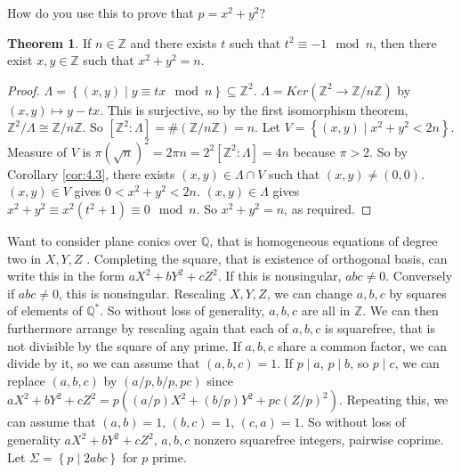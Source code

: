 \documentclass{article}
\newcommand{\Z}{\mathbb{Z}}
\newcommand{\Q}{\mathbb{Q}}
\newcommand{\rb}[1]{\left( #1 \right)}
\renewcommand{\sb}[1]{\left[ #1 \right]}
\newcommand{\cb}[1]{\left\{ #1 \right\}}
\theoremstyle{definition}\newtheorem{definition}{Definition}[section]
\theoremstyle{definition}\newtheorem{remark}[definition]{Remark}
\theoremstyle{definition}\newtheorem*{example}{Example}
\theoremstyle{definition}\newtheorem*{note}{Note}
\newtheorem{theorem}[definition]{Theorem}
\begin{document}
How do you use this to prove that $ p = x^2 + y^2 $?


\begin{theorem}
If $ n \in \Z $ and there exists $ t $ such that $ t^2 \equiv -1 \mod n $, then there exist $ x, y \in \Z $ such that $ x^2 + y^2 = n $.
\end{theorem}

\begin{proof}
$ \Lambda = \cb{\rb{x, y} \mid y \equiv tx \mod n} \subseteq \Z^2 $. $ \Lambda = Ker\rb{\Z^2 \to \Z / n\Z} $ by $ \rb{x, y} \mapsto y - tx $. This is surjective, so by the first isomorphism theorem, $ \Z^2 / \Lambda \cong \Z / n\Z $. So $ \sb{\Z^2 : \Lambda} = \#\rb{\Z / n\Z} = n $. Let $ V = \cb{\rb{x, y} \mid x^2 + y^2 < 2n} $. Measure of $ V $ is $ \pi\rb{\sqrt{n}}^2 = 2\pi n = 2^2\sb{\Z^2 : \Lambda} = 4n $ because $ \pi > 2 $. So by Corollary \ref{cor:4.3}, there exists $ \rb{x, y} \in \Lambda \cap V $ such that $ \rb{x, y} \ne \rb{0, 0} $. $ \rb{x, y} \in V $ gives $ 0 < x^2 + y^2 < 2n $. $ \rb{x, y} \in \Lambda $ gives $ x^2 + y^2 \equiv x^2\rb{t^2 + 1} \equiv 0 \mod n $. So $ x^2 + y^2 = n $, as required.
\end{proof}

Want to consider plane conics over $ \Q $, that is homogeneous equations of degree two in $ X, Y, Z $ . Completing the square, that is existence of orthogonal basis, can write this in the form $ aX^2 + bY^2 + cZ^2 $. If this is nonsingular, $ abc \ne 0 $. Conversely if $ abc \ne 0 $, this is nonsingular. Rescaling $ X, Y, Z $, we can change $ a, b, c $ by squares of elements of $ \Q^* $. So without loss of generality, $ a, b, c $ are all in $ \Z $. We can then furthermore arrange by rescaling again that each of $ a, b, c $ is squarefree, that is not divisible by the square of any prime. If $ a, b, c $ share a common factor, we can divide by it, so we can assume that $ \rb{a, b, c} = 1 $. If $ p \mid a $, $ p \mid b $, so $ p \mid c $, we can replace $ \rb{a, b, c} $ by $ \rb{a / p, b / p, pc} $ since $ aX^2 + bY^2 + cZ^2 = p\rb{\rb{a / p}X^2 + \rb{b / p}Y^2 + pc\rb{Z / p}^2} $. Repeating this, we can assume that $ \rb{a, b} = 1 $, $ \rb{b, c} = 1 $, $ \rb{c, a} = 1 $. So without loss of generality $ aX^2 + bY^2 + cZ^2 $, $ a, b, c $ nonzero squarefree integers, pairwise coprime. Let $ \Sigma = \cb{p \mid 2abc} $ for $ p $ prime.
\end{document}

